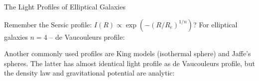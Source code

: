 \documentclass[letterpaper,landscape]{slides}
\begin{document}



\begin{slide}
\begin{center}
\vskip -0.1in
\end{center}


\vfill
\end{slide}


\begin{slide}
\begin{center}
{\large \color{red} 
           The Light Profiles of Elliptical Galaxies }
\end{center}




Remember the Sersic profile: $I(R) \propto \exp(-(R/R_e)^{1/n})$?
For elliptical galaxies $n=4$ -- de Vaucouleurs profile:

Another commonly used profiles are King models (isothermal sphere)
and Jaffe's spheres. The latter has almost identical light profile
as de Vaucouleurs profile, but the density law and gravitational 
potential are analytic:


\vfill
\end{slide}
\end{document}
